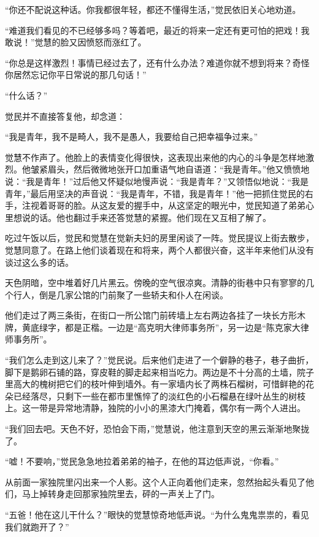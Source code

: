 \par “你还不配说这种话。你我都很年轻，都还不懂得生活，”觉民依旧关心地劝道。
\par “难道我们看见的不已经够多吗？等着吧，最近的将来一定还有更可怕的把戏！我敢说！”觉慧的脸又因愤怒而涨红了。
\par “你总是这样激烈！事情已经过去了，还有什么办法？难道你就不想到将来？奇怪你居然忘记你平日常说的那几句话！”
\par “什么话？”
\par 觉民并不直接答复他，却念道：
\par “我是青年，我不是畸人，我不是愚人，我要给自己把幸福争过来。”
\par 觉慧不作声了。他脸上的表情变化得很快，这表现出来他的内心的斗争是怎样地激烈。他皱紧眉头，然后微微地张开口加重语气地自语道：“我是青年。”他又愤愤地说：“我是青年！”过后他又怀疑似地慢声说：“我是青年？”又领悟似地说：“我是青年，”最后用坚决的声音说：“我是青年，不错，我是青年！”他一把抓住觉民的右手，注视着哥哥的脸。从这友爱的握手中，从这坚定的眼光中，觉民知道了弟弟心里想说的话。他也翻过手来还答觉慧的紧握。他们现在又互相了解了。
\par 吃过午饭以后，觉民和觉慧在觉新夫妇的房里闲谈了一阵。觉民提议上街去散步，觉慧同意了。在路上他们谈着现在和将来，两个人都很兴奋，这半年来他们从没有谈过这么多的话。
\par 天色阴暗，空中堆着好几片黑云。傍晚的空气很凉爽。清静的街巷中只有寥寥的几个行人，倒是几家公馆的门前聚了一些轿夫和仆人在闲谈。
\par 他们走过了两三条街，在街口一所公馆门前砖墙上左右两边各挂了一块长方形木牌，黄底绿字，都是正楷。一边是“高克明大律师事务所”，另一边是“陈克家大律师事务所”。
\par “我们怎么走到这儿来了？”觉民说。后来他们走进了一个僻静的巷子，巷子曲折，脚下是鹅卵石铺的路，穿皮鞋的脚走起来相当吃力。两边是不十分高的土墙，院子里高大的槐树把它们的枝叶伸到墙外。有一家墙内长了两株石榴树，可惜鲜艳的花朵已经落尽，只剩下一些在都市里憔悴了的淡红色的小石榴悬在绿叶丛生的树枝上。这一带是异常地清静，独院的小小的黑漆大门掩着，偶尔有一两个人进出。
\par “我们回去吧。天色不好，恐怕会下雨，”觉慧说，他注意到天空的黑云渐渐地聚拢了。
\par “嘘！不要响，”觉民急急地拉着弟弟的袖子，在他的耳边低声说，“你看。”
\par 从前面一家独院里闪出来一个人影。这个人正向着他们走来，忽然抬起头看见了他们，马上掉转身走回那家独院里去，砰的一声关上了门。
\par “五爸！他在这儿干什么？”眼快的觉慧惊奇地低声说。“为什么鬼鬼祟祟的，看见我们就跑开了？”
